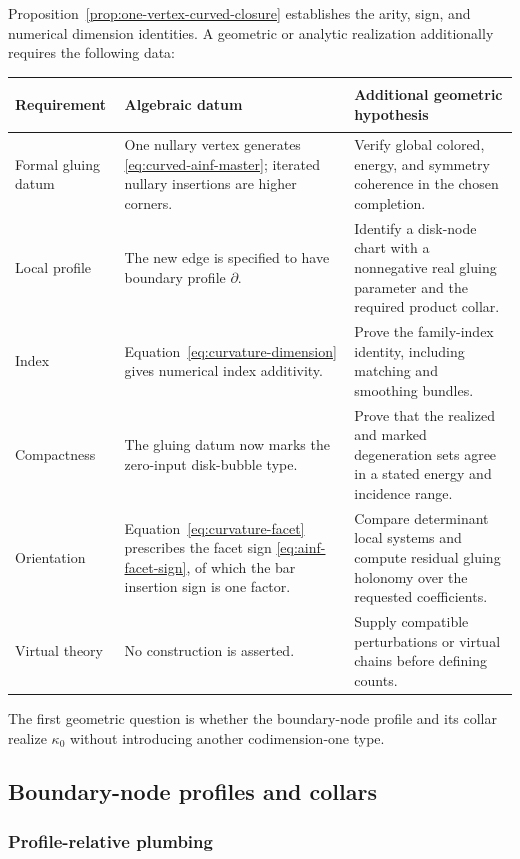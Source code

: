 \documentclass[11pt,letterpaper,twoside]{article}
\theoremstyle{plain}
\theoremstyle{definition}
\theoremstyle{remark}
\begin{document}
Proposition~\ref{prop:one-vertex-curved-closure} establishes the arity, sign, and numerical dimension identities.  A geometric or analytic realization additionally requires the following data:
\begin{center}
\small
\begin{tabularx}{\textwidth}{@{}>{\bfseries\raggedright\arraybackslash}p{}p{}X@{}}
\toprule
Requirement & Algebraic datum & Additional geometric hypothesis \\
\midrule
Formal gluing datum & One nullary vertex generates \eqref{eq:curved-ainf-master}; iterated nullary insertions are higher corners. & Verify global colored, energy, and symmetry coherence in the chosen completion. \\
Local profile & The new edge is specified to have boundary profile \(\partial\). & Identify a disk-node chart with a nonnegative real gluing parameter and the required product collar. \\
Index & Equation~\eqref{eq:curvature-dimension} gives numerical index additivity. & Prove the family-index identity, including matching and smoothing bundles. \\
Compactness & The gluing datum now marks the zero-input disk-bubble type. & Prove that the realized and marked degeneration sets agree in a stated energy and incidence range. \\
Orientation & Equation~\eqref{eq:curvature-facet} prescribes the facet sign \eqref{eq:ainf-facet-sign}, of which the bar insertion sign is one factor. & Compare determinant local systems and compute residual gluing holonomy over the requested coefficients. \\
Virtual theory & No construction is asserted. & Supply compatible perturbations or virtual chains before defining counts. \\
\bottomrule
\end{tabularx}
\end{center}

The first geometric question is whether the boundary-node profile and its collar realize \(\kappa_0\) without introducing another codimension-one type.

\subsection{Boundary-node profiles and collars}\label{sec:curved-profile}

\subsubsection{Profile-relative plumbing}
\end{document}
